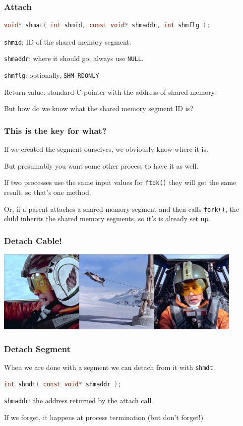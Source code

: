 \begin{frame}[fragile]
	\frametitle{Attach}
	\begin{lstlisting}[language=C]
void* shmat( int shmid, const void* shmaddr, int shmflg );
\end{lstlisting}

	\texttt{shmid}: ID of the shared memory segment.

	\texttt{shmaddr}: where it should go; always use \texttt{NULL}.

	\texttt{shmflg}: optionally, \texttt{SHM\_RDONLY}

	Return value: standard C pointer with the address of shared memory.

	But how do we know what the shared memory segment ID is?

\end{frame}

\begin{frame}
	\frametitle{This is the key for what?}

	If we created the segment ourselves, we obviously know where it is.

	But presumably you want some other process to have it as well.

	If two processes use the same input values for \texttt{ftok()} they will get the same result, so that's one method.

	Or, if a parent attaches a shared memory segment and then calls \texttt{fork()}, the child inherits the shared memory segments, so it's is already set up.


\end{frame}


\begin{frame}
	\frametitle{Detach Cable!}

	\begin{center}
		\includegraphics[width=0.9\textwidth]{images/detach-cable.jpg}
	\end{center}


\end{frame}

\begin{frame}[fragile]
	\frametitle{Detach Segment}

	When we are done with a segment we can detach from it with \texttt{shmdt}.

	\begin{lstlisting}[language=C]
int shmdt( const void* shmaddr );
\end{lstlisting}

	\texttt{shmaddr}: the address returned by the attach call

	If we forget, it happens at process termination (but don't forget!)
\end{frame}

